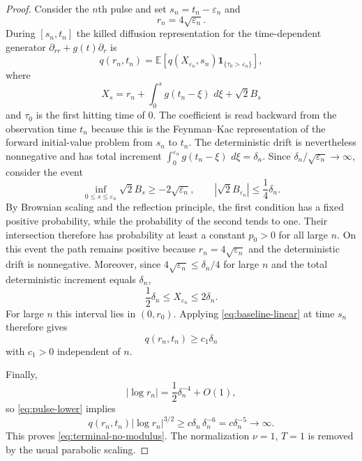 \documentclass[10pt,a4paper]{amsart}
\newcommand{\dd}{\,d}
\begin{document}
\begin{proof}
Consider the $n$th pulse and set $s_n=t_n-\varepsilon_n$ and
\[
 r_n=4\sqrt{\varepsilon_n}.
\]
During $[s_n,t_n]$ the killed diffusion representation for the time-dependent generator $\partial_{rr}+g(t)\partial_r$ is
\[
 q(r_n,t_n)=
 \mathbb E\left[q(X_{\varepsilon_n},s_n)
 \mathbf 1_{\{\tau_0>\varepsilon_n\}}\right],
\]
where
\[
 X_s=r_n+\int_0^s g(t_n-\xi)\,\dd\xi+\sqrt2 B_s
\]
and $\tau_0$ is the first hitting time of $0$.  The coefficient is read backward from the observation time $t_n$ because this is the Feynman--Kac representation of the forward initial-value problem from $s_n$ to $t_n$.  The deterministic drift is nevertheless nonnegative and has total increment
$\int_0^{\varepsilon_n}g(t_n-\xi)\,\dd\xi=\delta_n$.  Since $\delta_n/\sqrt{\varepsilon_n}\to\infty$, consider the event
\[
 \inf_{0\le s\le\varepsilon_n}\sqrt2B_s\ge-2\sqrt{\varepsilon_n},
 \qquad
 |\sqrt2B_{\varepsilon_n}|\le\frac14\delta_n.
\]
By Brownian scaling and the reflection principle, the first condition has a fixed positive probability, while the probability of the second tends to one.  Their intersection therefore has probability at least a constant $p_0>0$ for all large $n$.  On this event the path remains positive because $r_n=4\sqrt{\varepsilon_n}$ and the deterministic drift is nonnegative.  Moreover, since $4\sqrt{\varepsilon_n}\le\delta_n/4$ for large $n$ and the total deterministic increment equals $\delta_n$,
\[
 \frac12\delta_n\le X_{\varepsilon_n}\le2\delta_n.
\]
For large $n$ this interval lies in $(0,r_0)$.  Applying \eqref{eq:baseline-linear} at time $s_n$ therefore gives
\begin{equation}\label{eq:pulse-lower}
 q(r_n,t_n)\ge c_1\delta_n
\end{equation}
with $c_1>0$ independent of $n$.

Finally,
\[
 |\log r_n|=\frac12\delta_n^{-4}+O(1),
\]
so \eqref{eq:pulse-lower} implies
\[
 q(r_n,t_n)|\log r_n|^{3/2}
 \ge c\delta_n\,\delta_n^{-6}
 =c\delta_n^{-5}\longrightarrow\infty.
\]
This proves \eqref{eq:terminal-no-modulus}.  The normalization $\nu=1$, $T=1$ is removed by the usual parabolic scaling.
\end{proof}
\end{document}
